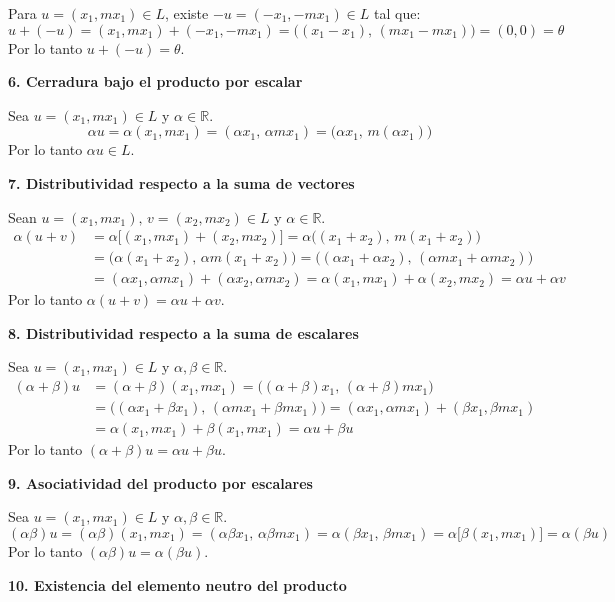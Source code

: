\documentclass[12pt]{article}
\begin{document}
\begin{enumerate}[label=\alph*.-]
    Para $u=(x_1,mx_1)\in L$, existe $-u=(-x_1,-mx_1) \in L$ tal que:
    \[
    u+(-u) = (x_1,mx_1)+(-x_1,-mx_1) = \big((x_1-x_1),\,(mx_1-mx_1)\big) = (0,0)=\theta
    \]
    Por lo tanto $u+(-u)=\theta$.

    \textbf{6. Cerradura bajo el producto por escalar}

    Sea $u=(x_1,mx_1)\in L$ y $\alpha \in \mathbb{R}$.
    \[
    \alpha u = \alpha(x_1,mx_1) = (\alpha x_1,\, \alpha m x_1) = \big(\alpha x_1,\, m(\alpha x_1)\big)
    \]
    Por lo tanto $\alpha u \in L$.

    \textbf{7. Distributividad respecto a la suma de vectores}

    Sean $u=(x_1,mx_1),\, v=(x_2,mx_2) \in L$ y $\alpha \in \mathbb{R}$.
    \begin{align*}
    \alpha(u+v) &= \alpha\big[(x_1,mx_1)+(x_2,mx_2)\big] = \alpha\big((x_1+x_2),\,m(x_1+x_2)\big)\\
    &= \big(\alpha(x_1+x_2),\,\alpha m(x_1+x_2)\big) = \big((\alpha x_1+\alpha x_2),\,(\alpha m x_1+\alpha m x_2)\big)\\
    &= (\alpha x_1,\alpha m x_1)+(\alpha x_2,\alpha m x_2) = \alpha(x_1,mx_1)+\alpha(x_2,mx_2) = \alpha u+\alpha v
    \end{align*}
    Por lo tanto $\alpha(u+v)=\alpha u+\alpha v$.

    \textbf{8. Distributividad respecto a la suma de escalares}

    Sea $u=(x_1,mx_1) \in L$ y $\alpha,\beta \in \mathbb{R}$.
    \begin{align*}
    (\alpha+\beta)u &= (\alpha+\beta)(x_1,mx_1) = \big((\alpha+\beta)x_1,\,(\alpha+\beta)mx_1\big)\\
    &= \big((\alpha x_1+\beta x_1),\,(\alpha m x_1+\beta m x_1)\big) = (\alpha x_1,\alpha m x_1)+(\beta x_1,\beta m x_1)\\
    &= \alpha(x_1,mx_1)+\beta(x_1,mx_1) = \alpha u+\beta u
    \end{align*}
    Por lo tanto $(\alpha+\beta)u = \alpha u+\beta u$.

    \textbf{9. Asociatividad del producto por escalares}

    Sea $u=(x_1,mx_1)\in L$ y $\alpha,\beta \in \mathbb{R}$.
    \[
    (\alpha\beta)u = (\alpha\beta)(x_1,mx_1) = (\alpha\beta x_1,\,\alpha\beta m x_1) = \alpha(\beta x_1,\,\beta m x_1) = \alpha\big[\beta(x_1,mx_1)\big] = \alpha(\beta u)
    \]
    Por lo tanto $(\alpha\beta)u = \alpha(\beta u)$.

    \textbf{10. Existencia del elemento neutro del producto}


\end{enumerate}
\end{document}
